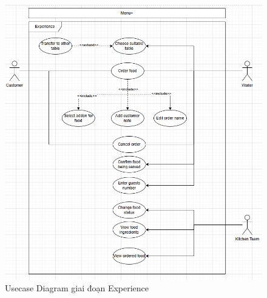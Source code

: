         \begin{figure}[H]
	\centering
	\includegraphics[width=\linewidth]{Images/ucd-experience.png}
	\caption{Usecase Diagram giai đoạn Experience}
        \end{figure}

